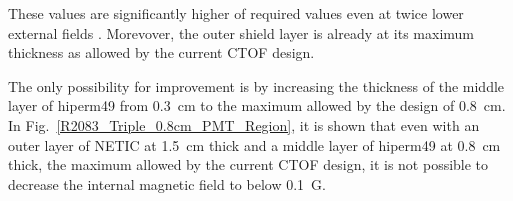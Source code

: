 \documentclass[12pt]{article}
\begin{document}
These values are  significantly  higher of  required values  even 
at  twice lower external fields . Morevover,
the outer shield layer is already at its maximum 
thickness as allowed by the current CTOF design. 

The only possibility for improvement is by increasing the thickness 
of the middle layer of hiperm49 from 0.3~cm to the maximum allowed by the design 
of 0.8~cm. In Fig.~\ref{R2083_Triple_0.8cm_PMT_Region}, it is shown 
that even with an outer layer of NETIC at 1.5~cm thick and a middle layer 
of hiperm49 at 0.8~cm thick, the maximum allowed by the current CTOF design, 
it is not possible to decrease the internal magnetic field to below 0.1~G. 


\begin{figure}[ht]
\centering
{}
\qquad
{}
\qquad
{}

\end{figure}
\end{document}
